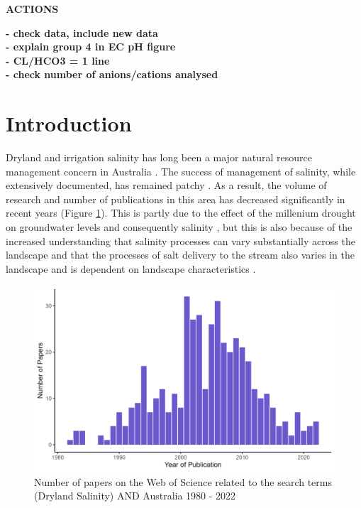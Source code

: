 \documentclass[, manuscript]{copernicus}
\begin{document}


\textbf{ACTIONS}

\textbf{ - check data, include new data\\
- explain group 4 in EC pH figure\\
- CL/HCO3 = 1 line\\
- check number of anions/cations analysed\\
}

\section{Introduction}

Dryland and irrigation salinity has long been a major natural resource
management concern in Australia
\citep{Jolly2001, White2009, Scanlon2007, Walker2002, Finlayson2010}.
The success of management of salinity, while extensively documented, has
remained patchy \citep{Leblanc2012}. As a result, the volume of research
and number of publications in this area has decreased significantly in
recent years (Figure \ref{fig:SalinityPapers}). This is partly due to
the effect of the millenium drought on groundwater levels and
consequently salinity \citep{Mcfarlane2016}, but this is also because of
the increased understanding that salinity processes can vary
substantially across the landscape \citep{Conyers2008} and that the
processes of salt delivery to the stream also varies in the landscape
\citep{Summerell2006, Hughes2007} and is dependent on landscape
characteristics \citep{vanDijk2008, Dalhaus2010}.

\begin{figure}
\includegraphics[width=0.9\linewidth]{Figures/Dryland Salinity Papers} \caption{Number of papers on the Web of Science related to the search terms (Dryland Salinity) AND Australia 1980 - 2022}\label{fig:SalinityPapers}
\end{figure}
\end{document}
